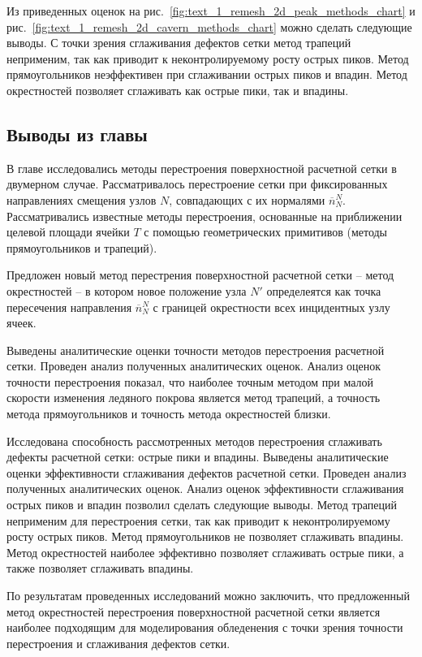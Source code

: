 Из приведенных оценок на рис.~\ref{fig:text_1_remesh_2d_peak_methods_chart} и рис.~\ref{fig:text_1_remesh_2d_cavern_methods_chart} можно сделать следующие выводы.
С точки зрения сглаживания дефектов сетки метод трапеций неприменим, так как приводит к неконтролируемому росту острых пиков.
Метод прямоугольников неэффективен при сглаживании острых пиков и впадин.
Метод окрестностей позволяет сглаживать как острые пики, так и впадины.


\subsection{Выводы из главы}

В главе исследовались методы перестроения поверхностной расчетной сетки в двумерном случае.
Рассматривалось перестроение сетки при фиксированных направлениях смещения узлов $N$, совпадающих с их нормалями $\overline{n}_{N}^N$.
Рассматривались известные методы перестроения, основанные на приближении целевой площади ячейки $T$ с помощью геометрических примитивов (методы прямоугольников и трапеций).

Предложен новый метод перестрения поверхностной расчетной сетки -- метод окрестностей -- в котором новое положение узла $N'$ определеятся как точка пересечения направления $\overline{n}_{N}^N$ с границей окрестности всех инцидентных узлу ячеек.

Выведены аналитические оценки точности методов перестроения расчетной сетки.
Проведен анализ полученных аналитических оценок.
Анализ оценок точности перестроения показал, что наиболее точным методом при малой скорости изменения ледяного покрова является метод трапеций, а точность метода прямоугольников и точность метода окрестностей близки.

Исследована способность рассмотренных методов перестроения сглаживать дефекты расчетной сетки: острые пики и впадины.
Выведены аналитические оценки эффективности сглаживания дефектов расчетной сетки.
Проведен анализ полученных аналитических оценок.
Анализ оценок эффективности сглаживания острых пиков и впадин позволил сделать следующие выводы.
Метод трапеций неприменим для перестроения сетки, так как приводит к неконтролируемому росту острых пиков.
Метод прямоугольников не позволяет сглаживать впадины.
Метод окрестностей наиболее эффективно позволяет сглаживать острые пики, а также позволяет сглаживать впадины.

По результатам проведенных исследований можно заключить, что предложенный метод окрестностей перестроения поверхностной расчетной сетки является наиболее подходящим для моделирования обледенения с точки зрения точности перестроения и сглаживания дефектов сетки.

